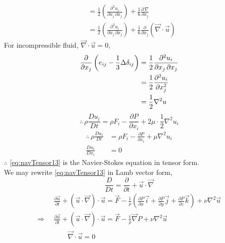 \documentclass[../main-sheet.tex]{subfiles}
\begin{document}
\begin{soln}
\begin{align*}
        &=\frac{1}{2}\left( \frac{\partial^2 u_i}{\partial x_j\,\partial x_j} \right)+\frac{1}{6}\frac{\partial\,\nabla}{\partial x_j}\\
        &=\frac{1}{2}\left( \frac{\partial^2 u_i}{\partial x_j\,\partial x_j} \right)+\frac{1}{6}\frac{\partial}{\partial x_j}(\vec{\nabla}\cdot\vec{u})
    \end{align*}
    For incompressible fluid, \(\vec{\nabla}\cdot\vec{u}=0\),
    \begin{align*}
        \frac{\partial }{\partial x_j}\left( e_{ij}-\frac{1}{3}\Delta \delta_{ij} \right)&=\frac{1}{2}\frac{\partial^2 u_i}{\partial x_j\,\partial x_j}\\
        &=\frac{1}{2} \frac{\partial^2 u_i}{\partial x_j^2}\\
        &=\frac{1}{2}\nabla^2u
    \end{align*}
    \[\therefore \, \rho \frac{D u_i}{D t}=\rho F_i-\frac{\partial P}{\partial x_i}+2\mu\cdot \frac{1}{2}\nabla^2u_i\]
    \begin{equation}
        \begin{aligned}
            \therefore \, \rho \frac{D u_i}{D t}&=\rho F_i-\frac{\partial P}{\partial x_i}+\mu\nabla^2u_i\\
            \frac{D u_i}{D x_i}&=0
        \end{aligned}
        \label{eq:navTensor13}
    \end{equation}
    \(\therefore\) \eqref{eq:navTensor13} is the Navier-Stokes equation in tensor form.\\
    We may rewrite \eqref{eq:navTensor13} in Lamb vector form,
    \[\frac{D}{D t}=\frac{\partial }{\partial t}+\vec{u}\cdot \vec{\nabla}\]
    \begin{align*}
        &\frac{\partial \vec{u}}{\partial t}+(\vec{u}\cdot \vec{\nabla})\cdot\vec{u}=\vec{F}-\frac{1}{\rho}\left( \frac{\partial P}{\partial x}\vec{i}+\frac{\partial P}{\partial y}\vec{j}+\frac{\partial P}{\partial z}\vec{k} \right)+\nu\nabla^2 \vec{u}\\
        \Rightarrow\;\;&\frac{\partial \vec{u}}{\partial t}+(\vec{u}\cdot \vec{\nabla})\cdot\vec{u}=\vec{F}-\frac{1}{\rho}\vec{\nabla}P+\nu\nabla^2 \vec{u}\\
        &\qquad\vec{\nabla}\cdot\vec{u}=0
    \end{align*}
\end{soln}
\end{document}

